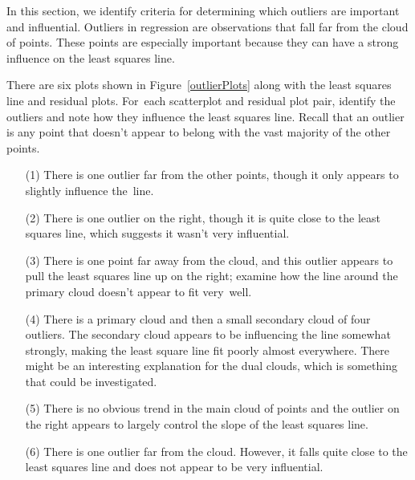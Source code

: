In this section, we identify criteria for determining which
outliers are important and influential.
Outliers in regression are observations that fall far from
the cloud of points.
These points are especially important because they can have
a strong influence on the least squares line. 

\begin{examplewrap}
\begin{nexample}{There are six plots shown in
    Figure~\ref{outlierPlots} along with the least squares
    line and residual plots.
    For~each scatterplot and residual plot pair,
    identify the outliers and note how they influence
    the least squares line.
    Recall that an outlier is any point that doesn't appear
    to belong with the vast majority of the other points.}
  \label{outlierPlotsExample}%
  \begin{itemize}
  \item[(1)]
      There is one outlier far from the other points,
      though it only appears to slightly influence the~line.
  \item[(2)]
      There is one outlier on the right, though it is quite
      close to the least squares line, which suggests it
      wasn't very influential.
  \item[(3)]
      There is one point far away from the cloud, and this
      outlier appears to pull the least squares line up on
      the right;
      examine how the line around the primary cloud doesn't
      appear to fit very~well.
  \item[(4)]
      There is a primary cloud and then a small secondary
      cloud of four outliers.
      The secondary cloud appears to be influencing the line
      somewhat strongly, making the least square line fit
      poorly almost everywhere.
      There might be an interesting explanation for the dual
      clouds, which is something that could be investigated.
  \item[(5)]
      There is no obvious trend in the main cloud of points
      and the outlier on the right appears to largely control
      the slope of the least squares line.
  \item[(6)]
      There is one outlier far from the cloud.
      However, it falls quite close to the least squares line
      and does not appear to be very influential.
  \end{itemize}
\end{nexample}
\end{examplewrap}

